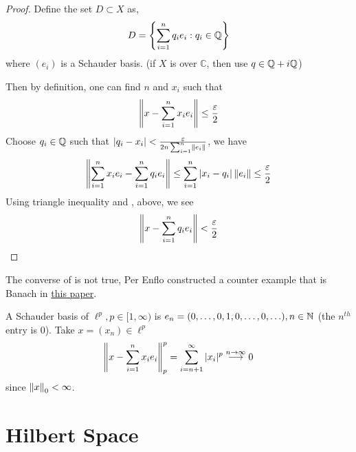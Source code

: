\documentclass{article}
\begin{document}
\begin{proof}
	Define the set $D \subset X$ as,
	$$
		D = \left\{\sum_{i=1}^n q_i e_i: q_i \in \mathbb{Q} \right\}
	$$
	where $(e_i)$ is a Schauder basis. (if $X$ is over $\mathbb{C}$, then use $q \in \mathbb{Q} + i \mathbb{Q}$)

	Then by definition, one can find $n$ and $x_i$ such that
	\begin{equation}
		\label{3}
		\left\|{x - \sum_{i=1}^n x_i e_i}\right\| \leq \frac{\varepsilon}{2}
	\end{equation}
	Choose $q_i \in \mathbb{Q}$ such that $|q_i - x_i|<\frac{\varepsilon}{2n \sum_{i=1}^n \left\|{e_i}\right\|}$, we have
	\begin{equation}
		\label{4}
		\left\|{\sum_{i=1}^n x_i e_i - \sum_{i=1}^n q_i e_i}\right\| \leq \sum_{i=1}^n |x_i-q_i| \left\|{e_i}\right\| \leq \frac{\varepsilon}{2}
	\end{equation}
	Using triangle inequality and ,  above, we see
	$$
		\left\|{x-\sum_{i=1}^n q_i e_i}\right\| < \frac{\varepsilon}{2}
	$$
\end{proof}

\begin{remark}
	The converse of  is not true, Per Enflo constructed a counter example that is Banach in \href{https://projecteuclid.org/download/pdf_1/euclid.acta/1485889774}{this paper}.
\end{remark}

\begin{example}
	A Schauder basis of $\ell^p, p\in [1, \infty)$ is $e_n=(0,\ldots, 0,1,0, \ldots,0,\ldots), n\in \mathbb{N}$ (the $n^{th}$ entry is $0$).
	Take $x=(x_n)\in \ell^p$
	$$
		\left\|{x-\sum_{i=1}^n x_ie_i}\right\|_p^p = \sum_{i=n+1}^{\infty} |x_i|^p \overset{n\to \infty}{\longrightarrow} 0
	$$
	since $\left\|{x}\right\|_0 < \infty$.
\end{example}



\section{Hilbert Space}

\begin{comment}
	Hilbert space is a special class of Banach space.
	Apart from completeness and norm, it is also equipped with an additional structure,
	{\bf inner product}. This allows us to explore nice geometric properties of the space,
	like orthogonality and angle. We'll see later that this structure resemble Euclidean space in many ways. A Hilbert space is naturally Banach, while the reverse may not be true.
\end{comment}
\end{document}
